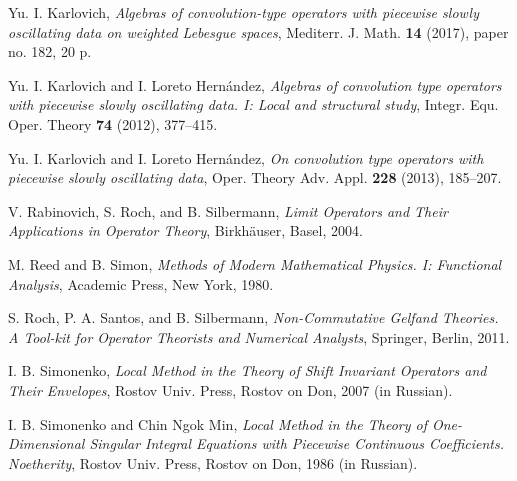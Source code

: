 \documentclass{birkjour}
\numberwithin{equation}{section}
\begin{document}
\begin{thebibliography}{XX}
Yu. I. Karlovich,
\textit{Algebras of convolution-type operators with piecewise slowly oscillating
data on weighted Lebesgue spaces},
Mediterr. J. Math. \textbf{14} (2017), paper no. 182, 20 p.

Yu. I. Karlovich and I. Loreto Hern\'andez,
\textit{Algebras of convolution type operators with piecewise
slowly oscillating data. I: Local and structural study},
Integr. Equ. Oper. Theory \textbf{74} (2012), 377--415.

Yu. I. Karlovich and I. Loreto Hern\'andez,
\textit{On convolution type operators with piecewise slowly oscillating data},
Oper. Theory Adv. Appl. \textbf{228} (2013), 185--207.

V. Rabinovich, S. Roch, and B. Silbermann,
\textit{Limit Operators and Their Applications in Operator Theory},
Birkh\"auser, Basel, 2004.

M. Reed and B. Simon,
\textit{Methods of Modern Mathematical Physics. I: Functional Analysis},
Academic Press, New York, 1980.

S. Roch, P. A. Santos, and B. Silbermann,
\textit{Non-Commutative Gelfand Theories. A Tool-kit for Operator Theorists
and Numerical Analysts},
Springer, Berlin, 2011.

I. B. Simonenko,
\textit{Local Method in the Theory of Shift Invariant Operators and Their
Envelopes},
Rostov Univ. Press, Rostov on Don, 2007 (in Russian).

I. B. Simonenko and Chin Ngok Min,
\textit{Local Method in the Theory of
One-Dimensional Singular Integral Equations with Piecewise Continuous
Coefficients. Noetherity},
Rostov Univ. Press, Rostov on Don, 1986 (in Russian).
\end{thebibliography}
\end{document}
